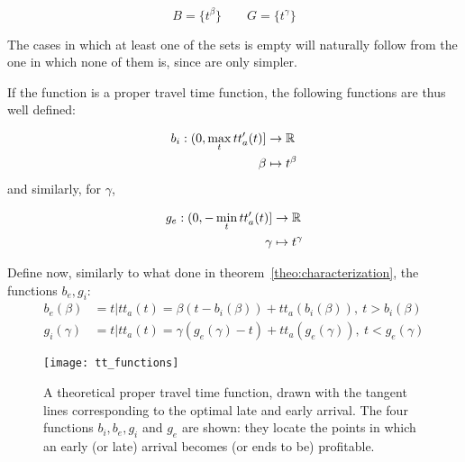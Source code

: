 \begin{equation}
  \label{eq:t_beta_t_gamma}
  B = \{t^\beta\}\qquad G = \{t^\gamma\}
\end{equation}

The cases in which at least one of the sets is empty will naturally follow from the one in which none of them is,
since are only simpler.

If the function is a proper travel time function, the following functions are thus well defined:

\begin{equation}
  \label{eq:def_b_i}
  \begin{split}
    b_i:(0, \max_t tt_a'(t)]&\rightarrow \mathbb{R} \\
    \beta & \mapsto t^\beta
  \end{split}
\end{equation}
and similarly, for \(\gamma\),

\begin{equation}
  \label{eq:def_g_e}
  \begin{split}
    g_e:(0, -\min_t tt_a'(t)]&\rightarrow \mathbb{R} \\
    \gamma & \mapsto t^\gamma
  \end{split}
\end{equation}

Define now, similarly to what done in theorem~\ref{theo:characterization}, the functions \(b_e, g_i\):
\begin{equation}
  \label{eq:def_b_e_g_i}
  \begin{split}
    b_e(\beta) & = t | tt_a(t) = \beta (t - b_i(\beta)) + tt_a(b_i(\beta)),\ t > b_i(\beta) \\
    g_i(\gamma) & = t | tt_a(t) = \gamma (g_e(\gamma) - t) + tt_a(g_e(\gamma)),\ t < g_e(\gamma)
  \end{split}
\end{equation}

\begin{figure}
  \centering
  \texttt{[image: tt\_functions]}
  \caption{A theoretical proper travel time function,
    drawn with the tangent lines corresponding to the optimal late and early arrival.
    The four functions \(b_i, b_e, g_i\) and \(g_e\) are shown:
  they locate the points in which an early (or late) arrival becomes (or ends to be) profitable.}
  \label{fig:tt_functions}
\end{figure}

